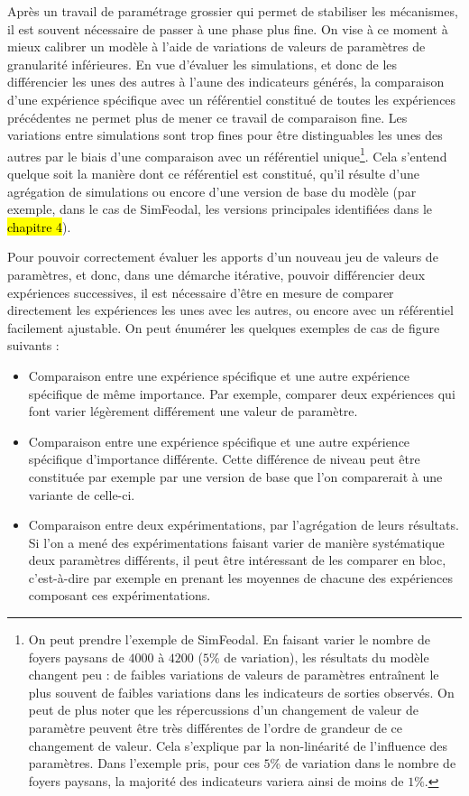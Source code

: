 	Après un travail de paramétrage grossier qui permet de stabiliser les mécanismes, il est souvent nécessaire de passer à une phase plus fine.
	On vise à ce moment à mieux calibrer un modèle à l'aide de variations de valeurs de paramètres de granularité inférieures.
	En vue d'évaluer les simulations, et donc de les différencier les unes des autres à l'aune des indicateurs générés, la comparaison d'une expérience spécifique avec un référentiel constitué de toutes les expériences précédentes ne permet plus de mener ce travail de comparaison fine.
	Les variations entre simulations sont trop fines pour être distinguables les unes des autres par le biais d'une comparaison avec un référentiel unique\footnote{
	On peut prendre l'exemple de SimFeodal.
	En faisant varier le nombre de foyers paysans de $4000$ à $4200$ ($5\%$ de variation), les résultats du modèle changent peu : de faibles variations de valeurs de paramètres entraînent le plus souvent de faibles variations dans les indicateurs de sorties observés.
	On peut de plus noter que les répercussions d'un changement de valeur de paramètre peuvent être très différentes de l'ordre de grandeur de ce changement de valeur.
	Cela s'explique par la non-linéarité de l'influence des paramètres.
	Dans l'exemple pris, pour ces $5\%$ de variation dans le nombre de foyers paysans, la majorité des indicateurs variera ainsi de moins de $1\%$.
	}.
	Cela s'entend quelque soit la manière dont ce référentiel est constitué, qu'il résulte d'une agrégation de simulations ou encore d'une version \og de base\fg{} du modèle (par exemple, dans le cas de SimFeodal, les versions principales identifiées dans le \hl{chapitre 4}).
	

	Pour pouvoir correctement évaluer les apports d'un nouveau jeu de valeurs de paramètres, et donc, dans une démarche itérative, pouvoir différencier deux expériences successives, il est nécessaire d'être en mesure de comparer directement les expériences les unes avec les autres, ou encore avec un référentiel facilement ajustable.
	On peut énumérer les quelques exemples de cas de figure suivants :
	\begin{itemize}
		\item Comparaison entre une expérience spécifique et une autre expérience spécifique de même \og importance\fg{}.
		Par exemple, comparer deux expériences qui font varier légèrement différement une valeur de paramètre.
		\item Comparaison entre une expérience spécifique et une autre expérience spécifique d'\og importance\fg{} différente.
		Cette différence de niveau peut être constituée par exemple par une version \og de base\fg{} que l'on comparerait à une variante de celle-ci.
		\item Comparaison entre deux expérimentations, par l'agrégation de leurs résultats.
		Si l'on a mené des expérimentations faisant varier de manière systématique deux paramètres différents, il peut être intéressant de les comparer en bloc, c'est-à-dire par exemple en prenant les moyennes de chacune des expériences composant ces expérimentations.
	\end{itemize}
	
